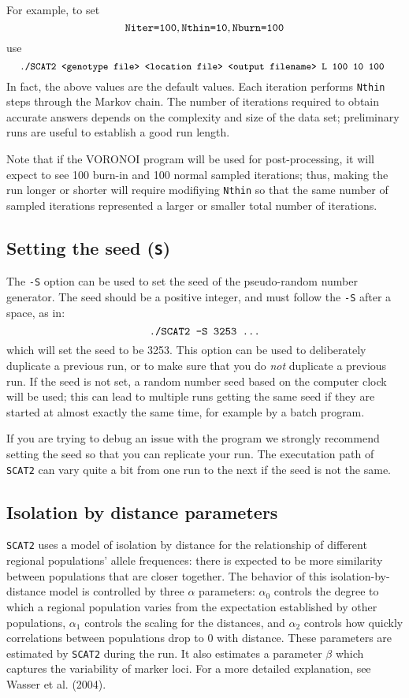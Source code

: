 \documentclass[10pt,titlepage,times,letterpaper]{article}
\def\SCAT{{\tt SCAT2} }
\begin{document}
For example, to set
$$\text{{\tt Niter=100}}, \text{{\tt Nthin=10}}, \text{{\tt Nburn=100}}$$
use
$$\text{{\tt \small./SCAT2 <genotype file> <location file> <output
filename> L 100 10 100 }}$$ 
In fact, the above values are the
default values. Each iteration performs {\tt Nthin}
steps through the Markov chain.
The number of iterations required to obtain accurate answers depends
on the complexity and size of the data set; preliminary runs are useful
to establish a good run length.

Note that if the VORONOI program will be used for post-processing, it will
expect to see 100 burn-in and 100 normal sampled iterations; thus, making the
run longer or shorter will require modifiying {\tt Nthin} so that the same
number of sampled iterations represented a larger or smaller total number
of iterations.

\subsection{Setting the seed ({\tt S})} \label{Soption}

The {\tt -S} option can be used to set the seed of the
pseudo-random number generator. The seed should be a
positive integer, and must follow the {\tt -S} after a space, as in:
$$\text{{\tt ./SCAT2 -S 3253 ...}}$$
which will set the seed to be 3253. This option can be
used to deliberately duplicate a previous run, or to make sure 
that you do {\it not}
duplicate a previous run.  If the seed is not set, a 
random number seed based on the computer clock will be used;
this can lead to multiple runs getting the same seed if they are started
at almost exactly the same time, for example by a batch program.

If you are trying to debug an issue with the program we strongly
recommend setting the seed so that you can replicate your run.  The
executation path of \SCAT can vary quite a bit from one run to the
next if the seed is not the same.

\subsection{Isolation by distance parameters}

\SCAT uses a model of isolation by distance for the relationship of
different regional populations' allele frequences:  there is expected to
be more similarity between populations that are closer together.  The
behavior of this isolation-by-distance model is controlled by three
$\alpha$ parameters:  $\alpha_0$ controls the degree to which a regional
population varies from the expectation established by other populations,
$\alpha_1$ controls the scaling for the distances, and $\alpha_2$
controls how quickly correlations between populations drop to 0 with distance.
These parameters are estimated by \SCAT during the run.
It also estimates a parameter $\beta$ which captures the variability
of marker loci.  For a more detailed explanation, see Wasser et al. (2004).
\end{document}
